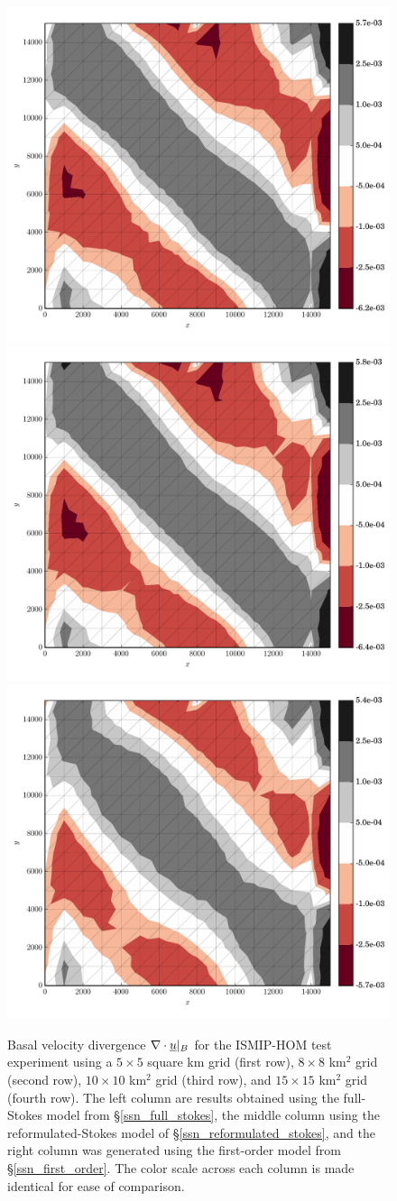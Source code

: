 \begin{figure}
    \includegraphics[width=0.3\linewidth]{images/momentum/ISMIP_HOM_A/large/FS/divU.pdf}
    \quad                                           
    \includegraphics[width=0.3\linewidth]{images/momentum/ISMIP_HOM_A/large/RS/divU.pdf}
    \quad                                           
    \includegraphics[width=0.3\linewidth]{images/momentum/ISMIP_HOM_A/large/BP/divU.pdf}

  \caption[ISMIP-HOM momentum experiment velocity divergence]{Basal velocity divergence $\nabla \cdot \underline{u} |_B$ for the ISMIP-HOM test experiment using a $5 \times 5$ square km grid (first row), $8 \times 8$ km$^2$ grid (second row), $10 \times 10$ km$^2$ grid (third row), and $15 \times 15$ km$^2$ grid (fourth row).  The left column are results obtained using the full-Stokes model from \S \ref{ssn_full_stokes}, the middle column using the reformulated-Stokes model of \S \ref{ssn_reformulated_stokes}, and the right column was generated using the first-order model from \S \ref{ssn_first_order}. The color scale across each column is made identical for ease of comparison.}
  \label{ismip_hom_a_divergence}
\end{figure}

